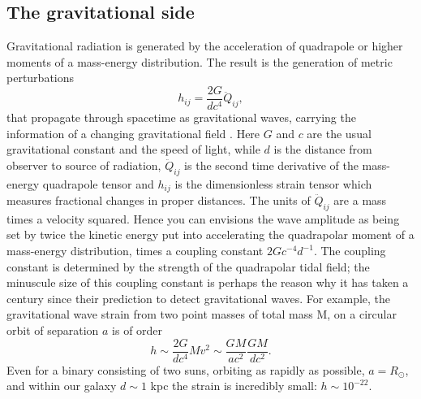 \subsection{The gravitational side} 

Gravitational radiation is generated by the acceleration of quadrapole or
higher moments of a mass-energy distribution. The result is the generation of
metric perturbations
\begin{equation}  
h_{i j} = \frac{2G}{d c^4}\ddot{Q}_{ij},  
\end{equation}
that propagate through spacetime as gravitational waves, carrying the
information of a changing gravitational field
\citep[\textit{e.g.}]{WaldGR:1984}. Here $G$ and $c$ are the usual gravitational
constant and the speed of light, while $d$ is the distance from observer to
source of radiation, $ \ddot{Q}_{ij}$ is the second time derivative of the
mass-energy quadrapole tensor and $h_{ij}$ is the dimensionless strain tensor
which measures fractional changes in proper distances. The units of
$\ddot{Q}_{ij}$ are a mass times a velocity squared. Hence you can envisions
the wave amplitude as being set by twice the kinetic energy put into
accelerating the quadrapolar moment of a mass-energy distribution, times a
coupling constant $2 Gc^{-4}d^{-1}$. The coupling constant is determined by
the strength of the quadrapolar tidal field; the minuscule size of this
coupling constant is perhaps the reason why it has taken a century since their
prediction to detect gravitational waves. For example, the gravitational wave
strain from two point masses of total mass M, on a circular orbit of
separation $a$ is of order \begin{equation}  h \sim \frac{2G}{d c^4} M v^2
\sim \frac{G M }{a c^2} \frac{G M }{d c^2}.  \label{Eq:BinStrain}
\end{equation} Even for a binary consisting of two suns, orbiting as rapidly
as possible, $a=R_{\odot}$, and within our galaxy $d \sim 1$ kpc the strain is
incredibly small: $h\sim10^{-22}$.



